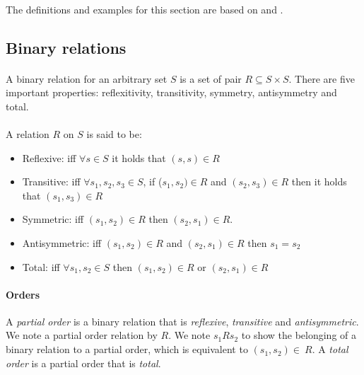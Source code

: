 \documentclass[letterpaper]{article}
\theoremstyle{definition}
\begin{document}
\paragraph{}

The definitions and examples for this section are based on \cite{bohy_phd}
and \cite{maquet_phd}.


\subsection{Binary relations}

\paragraph{}

A binary relation for an arbitrary set $S$ is
a set of pair $R \subseteq S \times S$.
There are five important properties: reflexitivity, transitivity,
symmetry, antisymmetry and total.

\paragraph{}

A relation $R$ on $S$ is said to be:

\begin{itemize}
    \item Reflexive:
    iff $\forall s \in S$ it holds that $(s, s) \in R$
    \item Transitive:
    iff $\forall s_1, s_2, s_3 \in S$,
    if ($s_1, s_2) \in R$ and $(s_2, s_3) \in R$
    then it holds that $(s_1, s_3) \in R$
    \item Symmetric: iff $(s_1, s_2) \in R$ then $(s_2, s_1) \in R$.
    \item Antisymmetric: iff $(s_1, s_2) \in R$
    and $(s_2, s_1) \in R$ then $s_1 = s_2$
    \item Total: iff $\forall s_1, s_2 \in S$ then $(s_1, s_2) \in R$
    or $(s_2, s_1) \in R$

\end{itemize}

\paragraph{Orders}

A \textit{partial order} is a binary relation that is \textit{reflexive},
\textit{transitive} and \textit{antisymmetric}. We note a
partial order relation by $R$.
We note $s_1 R  s_2$ to show the belonging of
a binary relation to a partial order, which is equivalent
to $(s_1, s_2) \in \ R$.
A \textit{total order} is a partial order that is \textit{total}.
\end{document}
